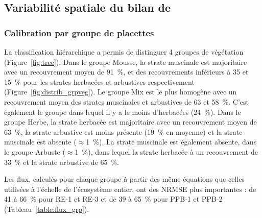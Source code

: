\subsection{Variabilité spatiale du bilan de \coo}

\subsubsection{Calibration par groupe de placettes}



La classification hiérarchique a permis de distinguer 4 groupes de végétation (Figure~\ref{fig:tree}).
Dans le groupe Mousse, la strate muscinale est majoritaire avec un recouvrement moyen de \SI{91}{\percent}, et des recouvrements inférieurs à \num{35} et \SI{15}{\percent} pour les strates herbacées et arbustives respectivement (Figure~\ref{fig:distrib_grpveg}).
Le groupe Mix est le plus homogène avec un recouvrement moyen des strates muscinales et arbustives de \num{63} et \SI{58}{\percent}.
C'est également le groupe dans lequel il y a le moins d'herbacées (\SI{24}{\percent}).
Dans le groupe Herbe, la strate herbacée est majoritaire avec un recouvrement moyen de \SI{63}{\percent}, la strate arbustive est moins présente (\SI{19}{\percent} en moyenne) et la strate muscinale est absente ($\approx$\SI{1}{\percent}).
La strate muscinale est également absente, dans le groupe Arbuste ($\approx$\SI{1}{\percent}), dans lequel la strate herbacée à un recouvrement de \SI{33}{\percent} et la strate arbustive de \SI{65}{\percent}.

Les flux, calculés pour chaque groupe à partir des même équations que celles utilisées à l'échelle de l'écosystème entier, ont des NRMSE plus importantes : de \num{41} à \SI{66}{\percent} pour RE-1 et RE-3 et de \num{39} à \SI{65}{\percent} pour PPB-1 et PPB-2 (Tableau~\ref{table:flux_grp}).


